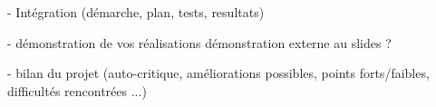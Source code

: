 \documentclass{beamer}
\begin{document}
\begin{frame}
- Intégration (démarche, plan, tests, resultats)
\end{frame}

\begin{frame}
- démonstration de vos réalisations
démonstration externe au slides ?
\end{frame}

\begin{frame}
- bilan du projet (auto-critique, améliorations possibles, points forts/faibles, difficultés rencontrées ...) 
\end{frame}
\end{document}
